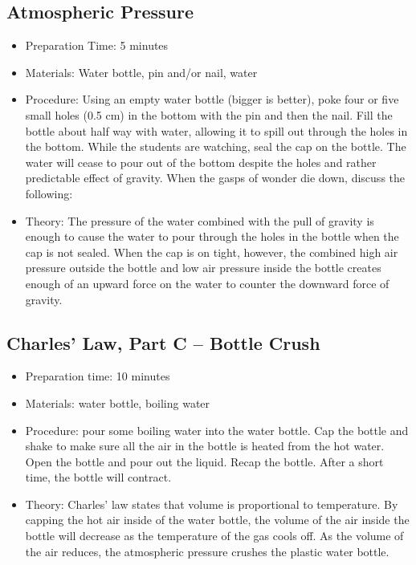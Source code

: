 	


\subsection{Atmospheric Pressure}
\begin{itemize}
\item{Preparation Time: 5 minutes}
\item{Materials: Water bottle, pin and/or nail, water}
\item{Procedure: Using an empty water bottle (bigger is better), poke four or five small holes (0.5 cm) in the bottom with the pin and then the nail. Fill the bottle about half way with water, allowing it to spill out through the holes in the bottom. While the students are watching, seal the cap on the bottle. The water will cease to pour out of the bottom despite the holes and rather predictable effect of gravity. When the gasps of wonder die down, discuss the following:}
\item{Theory: The pressure of the water combined with the pull of gravity is enough to cause the water to pour through the holes in the bottle when the cap is not sealed. When the cap is on tight, however, the combined high air pressure outside the bottle and low air pressure inside the bottle creates enough of an upward force on the water to counter the downward force of gravity.}
\end{itemize}


\subsection{Charles' Law, Part C -- Bottle Crush}
\begin{itemize}
\item{Preparation time: 10 minutes}
\item{Materials: water bottle, boiling water}
\item{Procedure: pour some boiling water into the water bottle. Cap the bottle and shake to make sure all the air in the bottle is heated from the hot water. Open the bottle and pour out the liquid. Recap the bottle. After a short time, the bottle will contract.}
\item{Theory: Charles' law states that volume is proportional to temperature. By capping the hot air inside of the water bottle, the volume of the air inside the bottle will decrease as the temperature of the gas cools off. As the volume of the air reduces, the atmospheric pressure crushes the plastic water bottle.}
\end{itemize}


